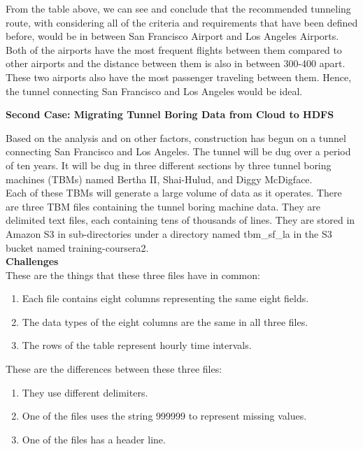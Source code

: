 \documentclass[a4paper,
							12pt,
							oneside,
							openright,
							DIV10,
							numbers=noendperiod
							]{scrreprt} %
\begin{document}
\noindent
From the table above, we can see and conclude that the recommended tunneling route, with considering all of the criteria and requirements that have been defined before, would be in between San Francisco Airport and Los Angeles Airports. Both of the airports have the most frequent flights between them compared to other airports and the distance between them is also in between 300-400 apart. These two airports also have the most passenger traveling between them. Hence, the tunnel connecting San Francisco and Los Angeles would be ideal.\\

\noindent
\begin{Large}
\textbf{Second Case: Migrating Tunnel Boring Data from Cloud to HDFS}\\
\end{Large}

\noindent
Based on the analysis and on other factors, construction has begun on a tunnel connecting San Francisco and Los Angeles. The tunnel will be dug over a period of ten years. It will be dug in three different sections by three tunnel boring machines (TBMs) named Bertha II, Shai-Hulud, and Diggy McDigface.\\

\noindent
Each of these TBMs will generate a large volume of data as it operates. There are three TBM files containing the tunnel boring machine data. They are delimited text files, each containing tens of thousands of lines. They are stored in Amazon S3 in sub-directories under a directory named tbm\_sf\_la in the S3 bucket named training-coursera2.\\

\noindent
\textbf{Challenges}\\

\noindent
These are the things that these three files have in common:
\begin{enumerate}
\item Each file contains eight columns representing the same eight fields.
\item The data types of the eight columns are the same in all three files.
\item  The rows of the table represent hourly time intervals.
\end{enumerate}

\noindent
These are the differences between these three files:
\begin{enumerate}
\item They use different delimiters.
\item One of the files uses the string 999999 to represent missing values.
\item One of the files has a header line.
\end{enumerate}
\end{document}
